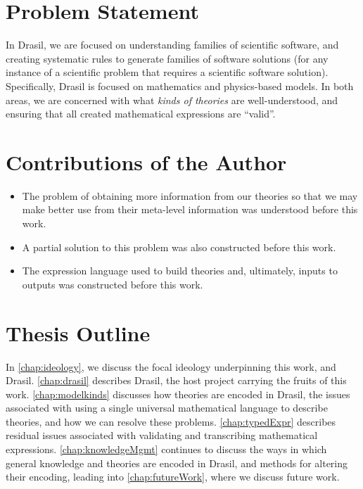 \section{Problem Statement}

In Drasil, we are focused on understanding families of scientific software, and
creating systematic rules to generate families of software solutions (for any
instance of a scientific problem that requires a scientific software solution).
Specifically, Drasil is focused on mathematics and physics-based models. In both
areas, we are concerned with what \textit{kinds of theories} are
well-understood, and ensuring that all created mathematical expressions are
``valid''.


\section{Contributions of the Author}

\begin{itemize}
      \item The problem of obtaining more information from our theories so that we
            may make better use from their meta-level information was understood
            before this work.
      \item A partial solution to this problem was also constructed before this
            work.
      \item The expression language used to build theories and, ultimately, inputs
            to outputs was constructed before this work.
\end{itemize}

\section{Thesis Outline}

In \autoref{chap:ideology}, we discuss the focal ideology underpinning this
work, and Drasil. \autoref{chap:drasil} describes Drasil, the host project
carrying the fruits of this work. \autoref{chap:modelkinds} discusses how
theories are encoded in Drasil, the issues associated with using a single
universal mathematical language to describe theories, and how we can resolve
these problems. \autoref{chap:typedExpr} describes residual issues associated
with validating and transcribing mathematical expressions.
\autoref{chap:knowledgeMgmt} continues to discuss the ways in which general
knowledge and theories are encoded in Drasil, and methods for altering their
encoding, leading into \autoref{chap:futureWork}, where we discuss future work.
